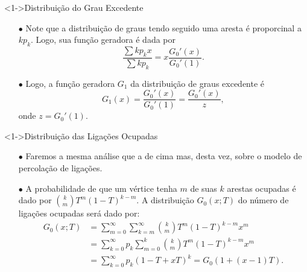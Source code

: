 \documentclass{beamer}
\begin{document}





\begin{frame}

\begin{exampleblock}
    <1->{Distribuição do Grau Excedente}

    \begin{itemize}

        \item[$\bullet$] Note que a distribuição de graus tendo seguido uma aresta é proporcinal 
            a $k p_k$. Logo, sua função geradora é dada por
            \[
                \frac{\sum k p_k x}{\sum k p_k} = x \frac{G_0 ' (x)}{ G_0 ' (1)}.
            \]
        \item[$\bullet$] Logo, a função geradora $G_1$ da distribuição de graus excedente é 
            \begin{equation}
                G_1(x) =  \frac{G_0 ' (x)}{ G_0 ' (1)} = \frac{G_0 ' (x)}{ z },
            \end{equation}
            onde $ z = G_0 ' (1)$.
    \end{itemize}


\end{exampleblock}

\end{frame}




\begin{frame}

\begin{exampleblock}
    <1->{Distribuição das Ligações Ocupadas}

    \begin{itemize}

        \item[$\bullet$] Faremos a mesma análise que a de cima mas, desta vez, sobre o modelo 
            de percolação de ligações. 
        
        \item[$\bullet$] A probabilidade de que um vértice tenha $m$ de suas $k$ arestas 
            ocupadas é dado por $\binom{k}{m} T^m (1-T)^{k-m}$. A distribuição 
            $G_0(x;T)$ do número de ligações ocupadas será dado por:
        \noindent
        \begin{align}
G_0(x;T) &= \sum_{m=0}^\infty \sum_{k = m}^\infty \binom{k}{m} T^m (1-T)^{k-m} x^m \\ 
         &= \sum_{k=0}^\infty p_k \sum_{m = 0}^k \binom{k}{m} T^m (1-T)^{k-m} x^m \\ 
         &= \sum_{k=0}^\infty p_k (1 - T + xT)^k
         = G_0 (1 +(x-1)T).
        \end{align}    


    \end{itemize}


\end{exampleblock}

\end{frame}
\end{document}

